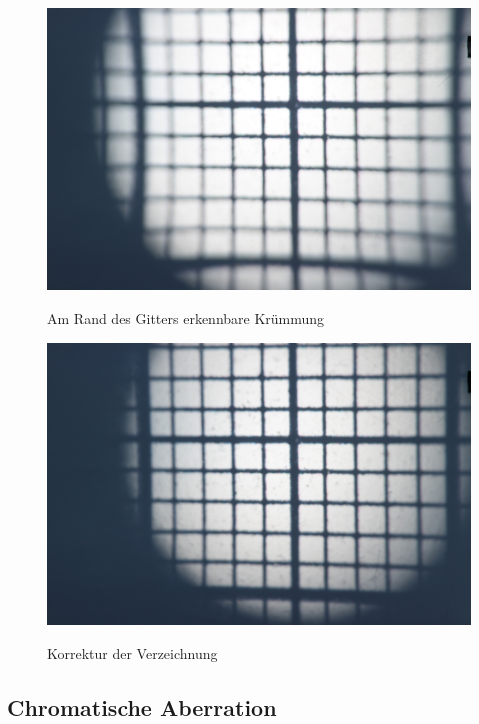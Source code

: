 \begin{figure}[htb]
	\begin{minipage}[t]{0.48\textwidth}
		\includegraphics[width=\linewidth]{img/Verzeichnung/Prakt_Linsenfehler_2015_06_04_082}
		\label{fig:verzeichnung}
		\caption{Am Rand des Gitters erkennbare Krümmung}
	\end{minipage}
	\hfill
	\begin{minipage}[t]{0.48\textwidth}
		\includegraphics[width=\linewidth]{img/Verzeichnung/Prakt_Linsenfehler_2015_06_04_083}
		\label{fig:verzeichnung_korrigiert}
		\caption{Korrektur der Verzeichnung}
	\end{minipage}
\end{figure}

\subsection{Chromatische Aberration}

